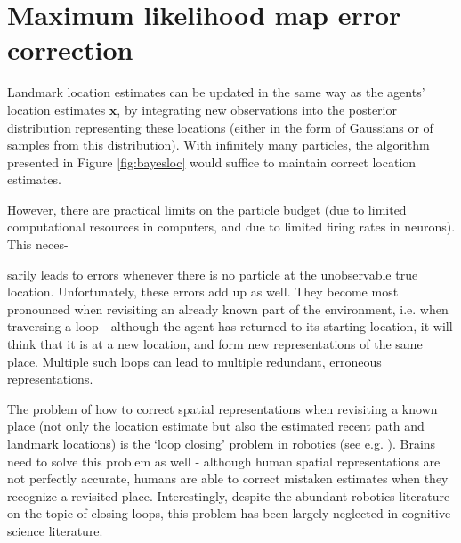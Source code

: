 
\section{Maximum likelihood map error correction}
\label{sec:bayescorr}

Landmark location estimates can be updated in the same way as the agents' location estimates $\bm x$, by integrating new observations into the posterior distribution representing these locations (either in the form of Gaussians or of samples from this distribution). With infinitely many particles, the algorithm presented in Figure \ref{fig:bayesloc} would suffice to maintain correct location estimates. 

However, there are practical limits on the particle budget (due to limited computational resources in computers, and due to limited firing rates in neurons). This neces-

\clearpage

\noindent sarily leads to errors whenever there is no particle at the unobservable true location. Unfortunately, these errors add up as well. They become most pronounced when revisiting an already known part of the environment, i.e. when traversing a loop - although the agent has returned to its starting location, it will think that it is at a new location, and form new representations of the same place. Multiple such loops can lead to multiple redundant, erroneous representations. 

The problem of how to correct spatial representations when revisiting a known place (not only the location estimate but also the estimated recent path and landmark locations) is the `loop closing' problem in robotics (see e.g. \citep{williams2009comparison, thrun2008simultaneous}). Brains need to solve this problem as well - although human spatial representations are not perfectly accurate, humans are able to correct mistaken estimates when they recognize a revisited place. Interestingly, despite the abundant robotics literature on the topic of closing loops, this problem has been largely neglected in cognitive science literature. 

